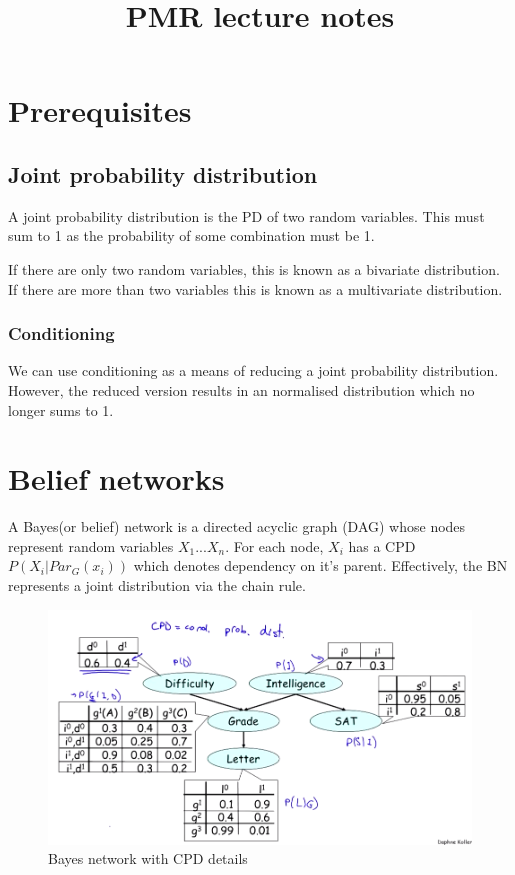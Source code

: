 \documentclass[11pt]{report}
\begin{document}
\title{PMR lecture notes}
\maketitle

\chapter{Prerequisites}

\section{Joint probability distribution}
A joint probability distribution is the PD of two random variables. This must sum to 1 as the probability of some combination must be 1.

If there are only two random variables, this is known as a bivariate distribution. If there are more than two variables this is known as a multivariate distribution. 

\subsection{Conditioning}
We can use conditioning as a means of reducing a joint probability distribution. However, the reduced version results in an normalised distribution which no longer sums to 1. 

\chapter{Belief networks}

A Bayes(or belief) network is a directed acyclic graph (DAG) whose nodes represent random variables $X_1...X_n$. For each node, $X_i$ has a CPD $P(X_i | Par_G(x_i))$ which denotes dependency on it's parent. Effectively, the BN represents a joint distribution via the chain rule.

\begin{figure}[H]
\centering
\includegraphics[scale=0.5]{images/cpd_bayesnetwork.png}
\caption{Bayes network with CPD details}
\label{belief1}
\end{figure}
\end{document}
